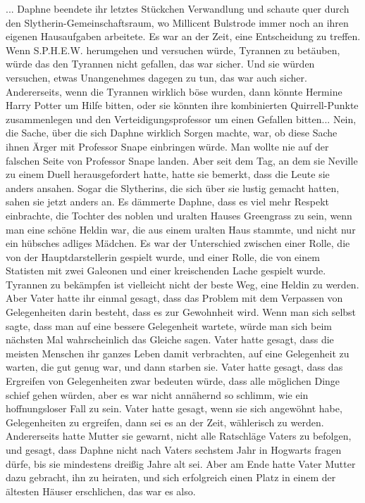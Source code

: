 ... Daphne beendete ihr letztes Stückchen Verwandlung und schaute quer durch den
Slytherin-Gemeinschaftsraum, wo Millicent Bulstrode immer noch an ihren eigenen
Hausaufgaben arbeitete. Es war an der Zeit, eine Entscheidung zu treffen. Wenn
S.P.H.E.W. herumgehen und versuchen würde, Tyrannen zu betäuben, würde das den
Tyrannen nicht gefallen, das war sicher. Und sie würden versuchen, etwas
Unangenehmes dagegen zu tun, das war auch sicher. Andererseits, wenn die
Tyrannen wirklich böse wurden, dann könnte Hermine Harry Potter um Hilfe bitten,
oder sie könnten ihre kombinierten Quirrell-Punkte zusammenlegen und den
Verteidigungsprofessor um einen Gefallen bitten... Nein, die Sache, über die
sich Daphne wirklich Sorgen machte, war, ob diese Sache ihnen Ärger mit
Professor Snape einbringen würde. Man wollte nie auf der falschen Seite von
Professor Snape landen. Aber seit dem Tag, an dem sie Neville zu einem Duell
herausgefordert hatte, hatte sie bemerkt, dass die Leute sie anders ansahen.
Sogar die Slytherins, die sich über sie lustig gemacht hatten, sahen sie jetzt
anders an. Es dämmerte Daphne, dass es viel mehr Respekt einbrachte, die Tochter
des noblen und uralten Hauses Greengrass zu sein, wenn man eine schöne Heldin
war, die aus einem uralten Haus stammte, und nicht nur ein hübsches adliges
Mädchen. Es war der Unterschied zwischen einer Rolle, die von der
Hauptdarstellerin gespielt wurde, und einer Rolle, die von einem Statisten mit
zwei Galeonen und einer kreischenden Lache gespielt wurde. Tyrannen zu bekämpfen
ist vielleicht nicht der beste Weg, eine Heldin zu werden. Aber Vater hatte ihr
einmal gesagt, dass das Problem mit dem Verpassen von Gelegenheiten darin
besteht, dass es zur Gewohnheit wird. Wenn man sich selbst sagte, dass man auf
eine bessere Gelegenheit wartete, würde man sich beim nächsten Mal
wahrscheinlich das Gleiche sagen. Vater hatte gesagt, dass die meisten Menschen
ihr ganzes Leben damit verbrachten, auf eine Gelegenheit zu warten, die gut
genug war, und dann starben sie. Vater hatte gesagt, dass das Ergreifen von
Gelegenheiten zwar bedeuten würde, dass alle möglichen Dinge schief gehen
würden, aber es war nicht annähernd so schlimm, wie ein hoffnungsloser Fall zu
sein. Vater hatte gesagt, wenn sie sich angewöhnt habe, Gelegenheiten zu
ergreifen, dann sei es an der Zeit, wählerisch zu werden. Andererseits hatte
Mutter sie gewarnt, nicht alle Ratschläge Vaters zu befolgen, und gesagt, dass
Daphne nicht nach Vaters sechstem Jahr in Hogwarts fragen dürfe, bis sie
mindestens dreißig Jahre alt sei. Aber am Ende hatte Vater Mutter dazu gebracht,
ihn zu heiraten, und sich erfolgreich einen Platz in einem der ältesten Häuser
erschlichen, das war es also.

